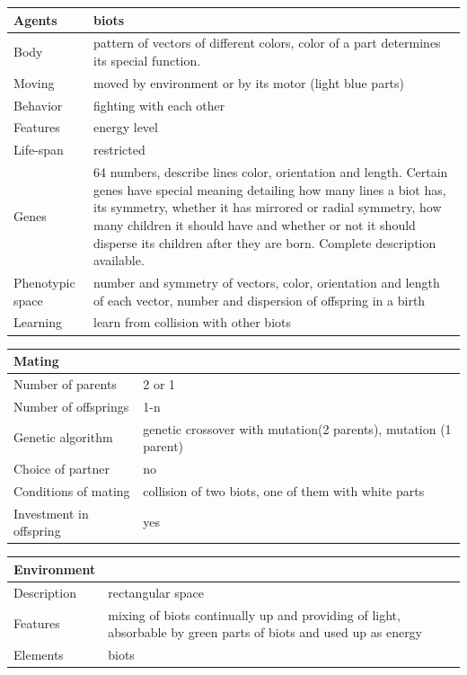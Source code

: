 \documentclass[a4paper,12pt]{report}
\begin{document}
 
\vspace{20pt}
 \begin{tabular}{|p{150pt}|p{220pt}|}
\hline
\textbf{Agents}&biots\\ \hline
Body&pattern of vectors of different colors, color of a part determines its special function.\\ \hline
Moving&moved by environment or by its motor (light blue parts)\\ \hline
Behavior&fighting with each other\\ \hline
Features&energy level\\ \hline
Life-span&restricted\\ \hline
Genes&64 numbers, describe lines color, orientation and length. Certain genes have special meaning detailing how many lines a biot has, its symmetry, whether it has mirrored or radial symmetry, how many children it should have and whether or not it should disperse its children after they are born. Complete description available.\\ \hline
Phenotypic space&number and symmetry of vectors, color, orientation and length of each vector, number and dispersion of offspring in a birth\\ \hline
Learning&learn from collision with other biots\\ \hline
\end{tabular} 

 \vspace{10pt}
 \begin{tabular}{|p{150pt}|p{220pt}|} \hline \textbf{Mating}&\\ \hline
Number of parents&2 or 1\\ \hline
Number of offsprings&1-n\\ \hline
Genetic algorithm&genetic crossover with mutation(2 parents), mutation (1 parent)\\ \hline
Choice of partner&no\\ \hline
Conditions of mating&collision of two biots, one of them with white parts\\ \hline
Investment in offspring&yes\\ \hline
\end{tabular} 

 \vspace{10pt}
 \begin{tabular}{|p{150pt}|p{220pt}|} \hline \textbf{Environment}&\\ \hline
Description&rectangular space\\ \hline
Features& mixing of biots continually up and providing of light, absorbable by green parts of biots and used up as energy\\ \hline
Elements&biots\\ \hline
\end{tabular} 
\end{document}

